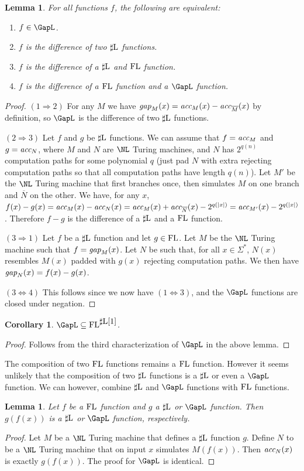 \documentclass{amsbook}
\newtheorem{lemma}[theorem]{Lemma}
\newtheorem{corollary}[theorem]{Corollary}
\theoremstyle{definition}
\theoremstyle{remark}
\numberwithin{section}{chapter}
\numberwithin{equation}{chapter}
\newcommand{\sharpL}{\mbox{$\sharp$\rm L}}
\newcommand{\FL}{\mbox{\rm FL}}
\newcommand{\acc}{\mbox{\it acc}}
\newcommand{\gap}{\mbox{\it gap}}
\begin{document}
\begin{lemma}
For all functions $f$, the following are equivalent:
\begin{enumerate}
\item $f\in\GapL$.
\item $f$ is the difference of two $\sharpL$ functions.
\item $f$ is the difference of a $\sharpL$ and $\FL$ function.
\item $f$ is the difference of a $\FL$ function and a $\GapL$ function.
\end{enumerate}
\end{lemma}
\begin{proof}
$(1\Rightarrow 2)$ For any $M$ we have $\gap_M(x)=\acc_M(x)-\acc_{\overline{M}}(x)$ by definition, so $\GapL$ is the difference of two $\sharpL$ functions.

$(2\Rightarrow 3)$ Let $f$ and $g$ be $\sharpL$ functions. We can assume that $f=\acc_M$ and $g=\acc_N$, where $M$ and $N$ are $\NL$ Turing machines, and $N$ has $2^{q(n)}$ computation paths for some polynomial $q$ (just pad $N$ with extra rejecting computation paths so that all computation paths have length $q(n)$). Let $M'$ be the $\NL$ Turing machine that first branches once, then simulates $M$ on one branch and $\overline{N}$ on the other. We have, for any $x$, $f(x)-g(x)=\acc_M(x)-\acc_N(x)=\acc_M(x)+\acc_{\overline{N}}(x)-2^{q(|x|)}=\acc_{M'}(x)-2^{q(|x|)}$. Therefore $f-g$ is the difference of a $\sharpL$ and a $\FL$ function.

$(3\Rightarrow 1)$ Let $f$ be a $\sharpL$ function and let $g\in\FL$. Let $M$ be the $\NL$ Turing machine such that $f=\gap_M(x)$. Let $N$ be such that, for all $x\in\Sigma^*$, $N(x)$ resembles $M(x)$ padded with $g(x)$ rejecting computation paths. We then have $\gap_N(x)=f(x)-g(x)$.

$(3\Leftrightarrow 4)$ This follows since we now have $(1\Leftrightarrow 3)$, and the $\GapL$ functions are closed under negation.
\end{proof}
\begin{corollary}\label{gaplequivsharpl}
$\GapL\subseteq\FL^{\sharpL{\mbox{\rm [1]}}}$.
\end{corollary}
\begin{proof}
Follows from the third characterization of $\GapL$ in the above lemma.
\end{proof}
The composition of two $\FL$ functions remains a $\FL$ function. However it seems unlikely that the composition of two $\sharpL$ functions is a $\sharpL$ or even a $\GapL$ function. We can however, combine $\sharpL$ and $\GapL$ functions with $\FL$ functions.
\begin{lemma}
Let $f$ be a $\FL$ function and $g$ a $\sharpL$ or $\GapL$ function. Then $g(f(x))$ is a $\sharpL$ or $\GapL$ function, respectively.
\end{lemma}
\begin{proof}
Let $M$ be a $\NL$ Turing machine that defines a $\sharpL$ function $g$. Define $N$ to be a $\NL$ Turing machine that on input $x$ simulates $M(f(x))$. Then $\acc_N(x)$ is exactly $g(f(x))$. The proof for $\GapL$ is identical.
\end{proof}
\end{document}
